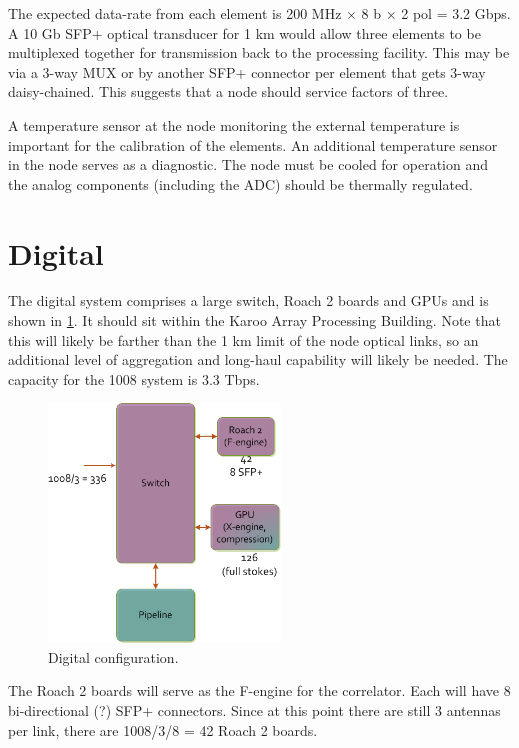 \documentclass[11pt]{article}
\begin{document}
The expected data-rate from each element is 200 MHz $\times$ 8 b $\times$ 2 pol = 3.2 Gbps.  A 10 Gb SFP+ optical transducer for 1 km would allow three elements to be multiplexed together for transmission back to the processing facility.  This may be via a 3-way MUX or by another SFP+ connector per element that gets 3-way daisy-chained.  This suggests that a node should service factors of three. 

A temperature sensor at the node monitoring the external temperature is important for the calibration of the elements.  An additional temperature sensor in the node serves as a diagnostic.  The node must be cooled for operation and the analog components (including the ADC) should be thermally regulated.

\section{Digital}
The digital system comprises a large switch, Roach 2 boards and GPUs and is shown in \ref{fig:digital}.  It should sit within the Karoo Array Processing Building.  Note that this will likely be farther than the 1 km limit of the node optical links, so an additional level of aggregation and long-haul capability will likely be needed.  The capacity for the 1008 system is 3.3 Tbps.

\begin{figure}[h]
\centering
\includegraphics[width=0.55\textwidth]{plots/Digital.png}
\caption{Digital configuration.}
\label{fig:digital}
\end{figure}

The Roach 2 boards will serve as the F-engine for the correlator.  Each will have 8 bi-directional (?) SFP+ connectors.  Since at this point there are still 3 antennas per link, there are 1008/3/8 = 42 Roach 2 boards.
\end{document}

